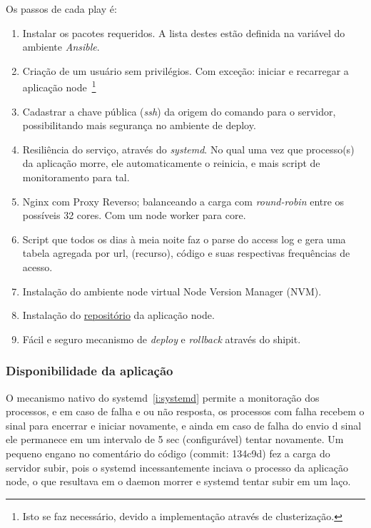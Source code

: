 Os passos de cada play é:
\begin{enumerate}
     \item Instalar os pacotes requeridos. A lista destes estão
     definida na variável do ambiente \emph{Ansible}.
     \item Criação de um usuário sem privilégios. Com exceção: iniciar e
     recarregar a aplicação node~\footnote{Isto se faz 
     necessário, devido a implementação através de clusterização.}
    \item Cadastrar a chave pública (\emph{ssh}) da origem do comando
      para o servidor, possibilitando mais segurança no ambiente de deploy.
    \item Resiliência do serviço, através do \emph{systemd}. No qual
        uma vez que processo(s) da aplicação morre, ele automaticamente
        o reinicia, e mais script de monitoramento para tal. \label{i:systemd}
    \item Nginx com Proxy Reverso; balanceando a carga com
      \emph{round-robin} entre os possíveis 32 cores. Com um node
      worker para core. \label{i:nginx}
    \item Script que todos os dias à meia noite faz o parse do access
      log e gera uma tabela agregada por url, (recurso), código e suas
      respectivas frequências de acesso.
    \item Instalação do ambiente node virtual Node Version Manager
      (NVM).
    \item Instalação do
      \href{https://github.com/alessandro11/desafio-2.git}{repositório}
      da aplicação node.
    \item Fácil e seguro mecanismo de \emph{deploy} e \emph{rollback}
      através do shipit.
\end{enumerate}


\subsubsection{Disponibilidade da aplicação}
O mecanismo nativo do systemd~\ref{i:systemd} permite a monitoração dos
processos, e em caso de falha e ou não resposta, os processos com falha  recebem o sinal para
encerrar e iniciar novamente, e ainda em caso de falha do envio d
sinal ele permanece em um intervalo de 5 sec (configurável) tentar novamente. Um pequeno engano no
comentário do código (commit: 134c9d) fez a carga do servidor subir, pois
o systemd incessantemente inciava o processo da aplicação node, o que
resultava em o daemon morrer e systemd tentar subir em um laço.

